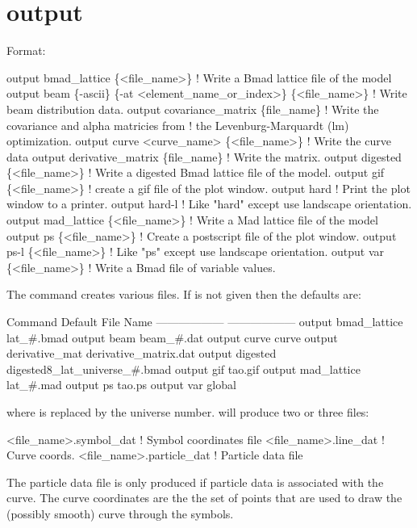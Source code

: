 {{{%
\section{output}
\label{s:output}

Format:
\begin{example}
  output bmad_lattice \{<file_name>\}       ! Write a Bmad lattice file of the model
  output beam \{-ascii\} \{-at <element_name_or_index>\} \{<file_name>\} 
                                          ! Write beam distribution data.
  output covariance_matrix \{file_name\}    ! Write the covariance and alpha matricies from 
                                          !   the Levenburg-Marquardt (lm) optimization.
  output curve <curve_name> \{<file_name>\} ! Write the curve data
  output derivative_matrix \{file_name\}    ! Write the  matrix.
  output digested \{<file_name>\}     ! Write a digested Bmad lattice file of the model.
  output gif \{<file_name>\}          ! create a gif file of the plot window.
  output hard                       ! Print the plot window to a printer.
  output hard-l                     ! Like "hard" except use landscape orientation. 
  output mad_lattice \{<file_name>\}  ! Write a Mad lattice file of the model
  output ps \{<file_name>\}           ! Create a postscript file of the plot window.
  output ps-l \{<file_name>\}         ! Like "ps" except use landscape orientation.
  output var \{<file_name>\}          ! Write a Bmad file of variable values.
\end{example}

\vskip 0.2in 
The  command creates various files. If
 is not given then the defaults are:
\begin{example}
  Command                         Default File Name
  ------------------              ------------------
  output bmad_lattice             lat_#.bmad
  output beam                     beam_#.dat
  output curve                    curve
  output derivative_mat           derivative_matrix.dat              
  output digested                 digested8_lat_universe_#.bmad
  output gif                      tao.gif
  output mad_lattice              lat_#.mad
  output ps                       tao.ps
  output var                      global%
\end{example}
where \vn{\#} is replaced by the universe number.  will produce two or three files: 
\begin{example}
  <file_name>.symbol_dat    ! Symbol coordinates file
  <file_name>.line_dat      ! Curve coords.
  <file_name>.particle_dat  ! Particle data file
\end{example}
The particle data file is only produced if particle
data is associated with the curve.
The curve coordinates are the the set of points that are used to draw the
(possibly smooth) curve through the symbols.

}}}
